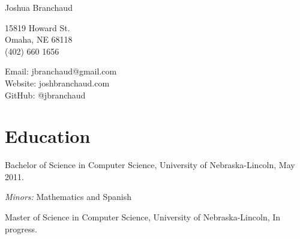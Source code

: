 \documentclass[10pt,letterpaper]{article}
\def\name{Joshua Branchaud}
\renewenvironment{itemize}{
  \begin{list}{}{
    \setlength{\leftmargin}{1.5em}
    \setlength{\itemsep}{0.25em}
    \setlength{\parskip}{0pt}
    \setlength{\parsep}{0.25em}
  }
}{
  \end{list}
}
\begin{document}
{\huge \name}


\vspace{0.25in}

\begin{minipage}[t]{0.5\textwidth}
  15819 Howard St. \\
  Omaha, NE 68118 \\
  (402) 660 1656
\end{minipage}
\begin{minipage}[t]{0.5\textwidth}
  Email: jbranchaud@gmail.com \\
  Website: joshbranchaud.com \\
  GitHub: @jbranchaud
\end{minipage}


%

\section*{Education}

\begin{itemize}


  \item Bachelor of Science in Computer Science, University of Nebraska-Lincoln, May 2011.

    \begin{itemize}
        \item \textit{Minors:} Mathematics and Spanish
    \end{itemize}
    
    \item Master of Science in Computer Science, University of Nebraska-Lincoln, In
    progress.

\end{itemize}
\end{document}
